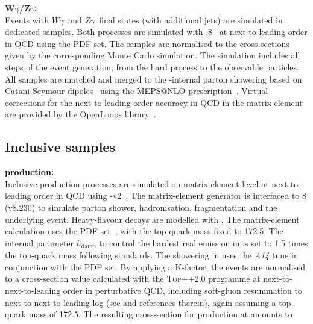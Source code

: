 \textbf{W$\gamma$/Z$\gamma$:} \\
Events with $W\gamma$~and $Z\gamma$~final states (with additional jets) are simulated in dedicated samples. Both processes are simulated with .8~\cite{Gleisberg:2008ta,Hoeche:2009rj} at next-to-leading order in QCD using the \nnpdfnnlo PDF set. %
The samples are normalised to the cross-sections given by the corresponding Monte Carlo simulation. The simulation includes all steps of the event generation, from the hard process to the observable particles. All samples are matched and merged to the \sherpa-internal parton showering based on Catani-Seymour dipoles~\cite{Gleisberg:2008fv,Schumann:2007mg} using the MEPS@NLO prescription~\cite{Hoeche:2011fd,Catani:2001cc,Hoeche:2012yf}. Virtual corrections for the next-to-leading order accuracy in QCD in the matrix element are provided by the OpenLoops library~\cite{Cascioli:2011va,Denner:2016kdg}.


\subsection{Inclusive samples}
\label{sec:used-incl-sampl}
\textbf{\ttbar production:}\\
Inclusive \ttbar production processes are simulated on matrix-element level at next-to-leading order in QCD using \powhegbox{}-\textsc{v2}~\cite{Nason:2004rx,Frixione:2007vw,Alioli:2010xd}. The matrix-element generator is interfaced to \pythia{}8 (v8.230) to simulate parton shower, hadronisation, fragmentation and the underlying event. Heavy-flavour decays are modelled with \evtgen. The matrix-element calculation uses the \nnpdfnlo PDF set~\cite{Ball:2014uwa}, with the top-quark mass fixed to \SI{172.5}{\gev}. The internal parameter $h_{\text{damp}}$ to control the hardest real emission in \POWHEG is set to 1.5 times the top-quark mass following \atlas standards. The showering in \pythia uses the \emph{A14} tune in conjunction with the \nnpdflo PDF set. By applying a K-factor, the events are normalised to a cross-section value calculated with the \textsc{Top++2.0} programme at next-to-next-to-leading order in perturbative QCD, including soft-gluon resummation to next-to-next-to-leading-log (see \cite{Czakon:2011xx} and references therein), again assuming a top-quark mass of \SI{172.5}{\gev}. The resulting cross-section for \ttbar production at \sqrtsfull amounts to %

